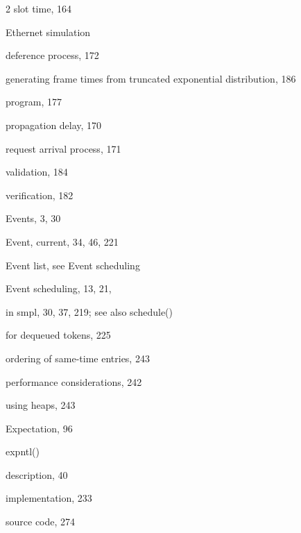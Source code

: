 \begin{multicols}{2}
\quad slot time, 164\par
\noindent Ethernet simulation\par
\quad deference process, 172\par
\quad generating frame times from truncated exponential distribution, 186\par
\quad program, 177\par
\quad propagation delay, 170\par
\quad request arrival process, 171\par
\quad validation, 184\par
\quad verification, 182\par
\noindent Events, 3, 30\par
\noindent Event, current, 34, 46, 221\par
\noindent Event list, see Event scheduling\par
\noindent Event scheduling, 13, 21,\par
\quad in smpl, 30, 37, 219; see also schedule()\par
\quad for dequeued tokens, 225\par
\quad ordering of same-time entries, 243\par
\quad performance considerations, 242\par
\quad using heaps, 243\par
\noindent Expectation, 96\par
\noindent expntl()\par
\quad description, 40\par
\quad implementation, 233\par
\quad source code, 274\par

\end{multicols}
